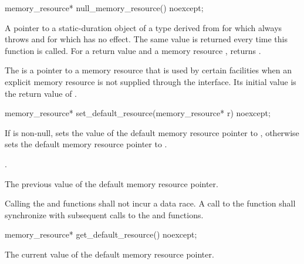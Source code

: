 %
\begin{itemdecl}
memory_resource* null_memory_resource() noexcept;
\end{itemdecl}

\begin{itemdescr}
\pnum
\returns
A pointer to a static-duration object of a type derived from 
for which  always throws  and
for which  has no effect.
The same value is returned every time this function is called.
For a return value  and a memory resource ,
 returns .
\end{itemdescr}

\pnum
The  is a pointer to a memory resource
that is used by certain facilities when an explicit memory resource
is not supplied through the interface.
Its initial value is the return value of .

%
\begin{itemdecl}
memory_resource* set_default_resource(memory_resource* r) noexcept;
\end{itemdecl}

\begin{itemdescr}
\pnum
\effects
If  is non-null,
sets the value of the default memory resource pointer to ,
otherwise sets the default memory resource pointer to .

\pnum
\postcondition
{}.

\pnum
\returns
The previous value of the default memory resource pointer.

\pnum
\remarks
Calling the  and
 functions shall not incur a data race.
A call to the  function
shall synchronize with subsequent calls to
the  and  functions.
\end{itemdescr}

%
\begin{itemdecl}
memory_resource* get_default_resource() noexcept;
\end{itemdecl}

\begin{itemdescr}
\pnum
\returns
The current value of the default memory resource pointer.
\end{itemdescr}

